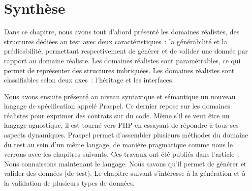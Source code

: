 \section{Synthèse}
\label{section:language:summary}

Dans ce chapitre, nous avons tout d'abord présenté les domaines réalistes, des
structures dédiées au test avec deux caractéristiques~: la générabilité et la
prédicabilité, permettant respectivement de générer et de valider une donnée par
rapport au domaine réaliste. Les domaines réalistes sont paramétrables, ce qui
permet de représenter des structures imbriquées. Les domaines réalistes sont
classifiables selon deux axes~: l'héritage et les interfaces.

Nous avons ensuite présenté au niveau syntaxique et sémantique un nouveau
langage de spécification appelé Praspel. Ce dernier repose sur les domaines
réalistes pour exprimer des contrats sur du code. Même s'il se veut être un
langage agnostique, il est tourné vers PHP en essayant de répondre à tous ses
aspects dynamiques. Praspel permet d'assembler plusieurs méthodes du domaine du
test au sein d'un même langage, de manière pragmatique comme nous le verrons
avec les chapitres suivants. Ces travaux ont été publiés dans
l'article~. \\

Nous connaissons maintenant le langage. Nous savons qu'il permet de générer et
valider des données (de test). Le chapitre suivant s'intéresse à la génération
et à la validation de plusieurs types de données.

